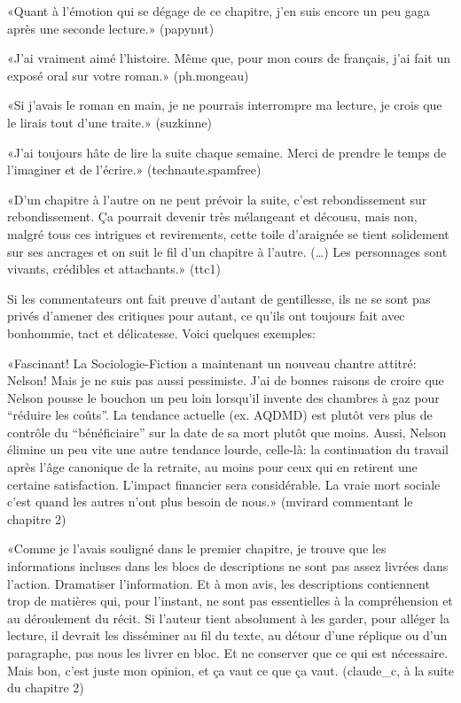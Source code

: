 \begin{Postface}
    «Quant à l’émotion qui se dégage de ce chapitre, j’en suis encore un peu gaga après une seconde lecture.» (papynut)

    «J’ai vraiment aimé l’histoire. Même que, pour mon cours de français, j’ai fait un exposé oral sur votre roman.» (ph.mongeau)

    «Si j’avais le roman en main, je ne pourrais interrompre ma lecture, je crois que le lirais tout d’une traite.» (suzkinne)

    «J’ai toujours hâte de lire la suite chaque semaine. Merci de prendre le temps de l’imaginer et de l’écrire.» (technaute.spamfree)

    «D’un chapitre à l’autre on ne peut prévoir la suite, c’est rebondissement sur rebondissement. Ça pourrait devenir très mélangeant et décousu, mais non, malgré tous ces intrigues et revirements, cette toile d’araignée se tient solidement sur ses ancrages et on suit le fil d’un chapitre à l’autre. (…) Les personnages sont vivants, crédibles et attachants.» (ttc1)

Si les commentateurs ont fait preuve d’autant de gentillesse, ils ne se sont pas privés d’amener des critiques pour autant, ce qu’ils ont toujours fait avec bonhommie, tact et délicatesse. Voici quelques exemples:

    «Fascinant! La Sociologie-Fiction a maintenant un nouveau chantre attitré: Nelson! Mais je ne suis pas aussi pessimiste. J’ai de bonnes raisons de croire que Nelson pousse le bouchon un peu loin lorsqu’il invente des chambres à gaz pour “réduire les coûts”. La tendance actuelle (ex. AQDMD) est plutôt vers plus de contrôle du “bénéficiaire” sur la date de sa mort plutôt que moins. Aussi, Nelson élimine un peu vite une autre tendance lourde, celle-là: la continuation du travail après l’âge canonique de la retraite, au moins pour ceux qui en retirent une certaine satisfaction. L’impact financier sera considérable. La vraie mort sociale c’est quand les autres n’ont plus besoin de nous.» (mvirard commentant le chapitre 2)

    «Comme je l’avais souligné dans le premier chapitre, je trouve que les informations incluses dans les blocs de descriptions ne sont pas assez livrées dans l’action. Dramatiser l’information. Et à mon avis, les descriptions contiennent trop de matières qui, pour l’instant, ne sont pas essentielles à la compréhension et au déroulement du récit. Si l’auteur tient absolument à les garder, pour alléger la lecture, il devrait les disséminer au fil du texte, au détour d’une réplique ou d’un paragraphe, pas nous les livrer en bloc. Et ne conserver que ce qui est nécessaire. Mais bon, c’est juste mon opinion, et ça vaut ce que ça vaut. (claude_c, à la suite du chapitre 2)


\end{Postface}
